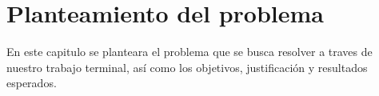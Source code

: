 \chapter{Planteamiento del problema}
En este capitulo se planteara el problema que se busca resolver a traves de nuestro trabajo terminal, así como los objetivos, justificación y resultados esperados.